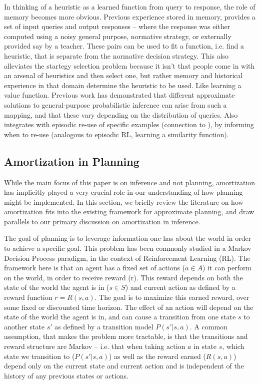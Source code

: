 In thinking of a heuristic as a learned function from query to response, the role of memory becomes more obvious. Previous experience stored in memory, provides a set of input queries and output responses -- where the response was either computed using a noisy general purpose, normative strategy, or externally provided say by a teacher. These pairs can be used to fit a function, i.e. find a heuristic, that is separate from the normative decision strategy. This also alleviates the startegy selection problem because it isn't that people come in with an arsenal of heuristics and then select one, but rather memory and historical experience in that domain determine the heuristic to be used. Like learning a value function. Previous work \citep{gluck1988conditioning, dasgupta2019theory, shanks1991connectionist} has demonstrated that different approximate solutions to general-purpose probabilistic inference can arise from such a mapping, and that these vary depending on the distribution of queries. Also integrates with episodic re-use of specific examples (connection to \cite{dasgupta2018remembrance}), by informing when to re-use (analogous to episodic RL, learning a similarity function).



\subsection{Amortization in Planning}

While the main focus of this paper is on inference and not planning, amortization has implicitly played a very crucial role in our understanding of how planning might be implemented. In this section, we briefly review the literature on how amortization fits into the existing framework for approximate planning, and draw parallels to our primary discussion on amortization in inference.

The goal of planning is to leverage information one has about the world in order to achieve a specific goal. This problem has been commonly studied in a Markov Decision Process paradigm, in the context of Reinforcement Learning (RL). The framework here is that an agent has a fixed set of actions ($a \in A$) it can perform on the world, in order to receive reward (r). This reward depends on both the state of the world the agent is in ($s \in S$) and current action as defined by a reward function $r = R(s, a)$. The goal is to maximize this earned reward, over some fixed or discounted time horizon. The effect of an action will depend on the state of the world the agent is in, and can cause a transition from one state $s$ to another state $s'$ as defined by a transition model $P(s' | s, a)$. A common assumption, that makes the problem more tractable, is that the transitions and reward structure are Markov -- i.e. that when taking action $a$ in state $s$, which state we transition to ($P(s' | s, a)$) as well as the reward earned ($R(s,a)$) depend only on the current state and current action and is independent of the history of any previous states or actions.

